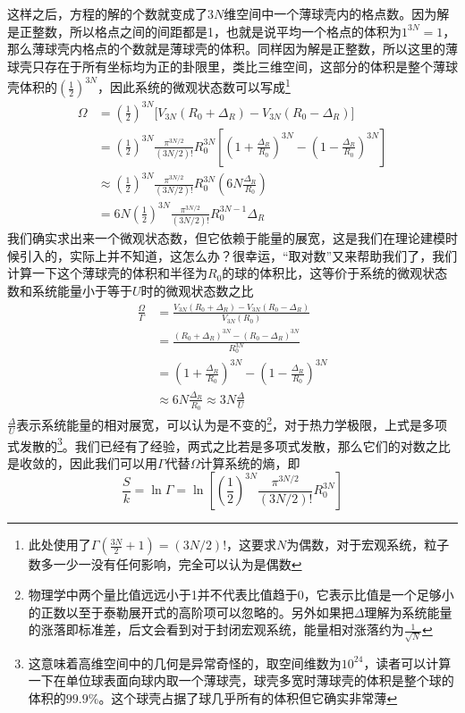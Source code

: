 \documentclass[../../main.tex]{subfiles}
\begin{document}
这样之后，方程的解的个数就变成了\(3N\)维空间中一个薄球壳内的格点数。因为解是正整数，所以格点之间的间距都是1，也就是说平均一个格点的体积为\(1^{3N}=1\)，那么薄球壳内格点的个数就是薄球壳的体积。同样因为解是正整数，所以这里的薄球壳只存在于所有坐标均为正的卦限里，类比三维空间，这部分的体积是整个薄球壳体积的\(\left(\frac{1}{2}\right)^{3N}\)，因此系统的微观状态数可以写成\footnote{此处使用了\(\Gamma(\frac{3N}{2}+1)=(3N/2)!\)，这要求\(N\)为偶数，对于宏观系统，粒子数多一少一没有任何影响，完全可以认为是偶数}
\begin{equation}
    \begin{split}
        \Omega&=\left(\frac{1}{2}\right)^{3N}\bigg[V_{3N}(R_0+\Delta_R)-V_{3N}(R_0-\Delta_R)\bigg] \\
        &=\left(\frac{1}{2}\right)^{3N}\frac{\pi^{3N/2}}{(3N/2)!}R_0^{3N}\left[\left(1+\frac{\Delta_R}{R_0}\right)^{3N}-\left(1-\frac{\Delta_R}{R_0}\right)^{3N}\right] \\
        &\approx \left(\frac{1}{2}\right)^{3N}\frac{\pi^{3N/2}}{(3N/2)!}R_0^{3N}\left(6N\frac{\Delta_R}{R_0}\right) \\
        &=6N\left(\frac{1}{2}\right)^{3N}\frac{\pi^{3N/2}}{(3N/2)!}R_0^{3N-1}\Delta_R
    \end{split}
\end{equation}
我们确实求出来一个微观状态数，但它依赖于能量的展宽，这是我们在理论建模时候引入的，实际上并不知道，这怎么办？很幸运，“取对数”又来帮助我们了，我们计算一下这个薄球壳的体积和半径为\(R_0\)的球的体积比，这等价于系统的微观状态数和系统能量小于等于\(U\)时的微观状态数之比
\begin{equation}
    \begin{split}
        \frac{\Omega}{\Gamma}&=\frac{V_{3N}(R_0+\Delta_R)-V_{3N}(R_0-\Delta_R)}{V_{3N}(R_0)} \\
        &=\frac{(R_0+\Delta_R)^{3N}-(R_0-\Delta_R)^{3N}}{R_0^{3N}} \\
        &=\left(1+\frac{\Delta_R}{R_0}\right)^{3N}-\left(1-\frac{\Delta_R}{R_0}\right)^{3N} \\
        &\approx 6N\frac{\Delta_R}{R_0} \approx 3N\frac{\Delta}{U}
    \end{split}
\end{equation}
\(\frac{\Delta}{U}\)表示系统能量的相对展宽，可以认为是不变的\footnote{物理学中两个量比值远远小于1并不代表比值趋于0，它表示比值是一个足够小的正数以至于泰勒展开式的高阶项可以忽略的。另外如果把\(\Delta\)理解为系统能量的涨落即标准差，后文会看到对于封闭宏观系统，能量相对涨落约为\(\frac{1}{\sqrt{N}}\)}，对于热力学极限，上式是多项式发散的\footnote{这意味着高维空间中的几何是异常奇怪的，取空间维数为\(10^{24}\)，读者可以计算一下在单位球表面向球内取一个薄球壳，球壳多宽时薄球壳的体积是整个球的体积的\(99.9\%\)。这个球壳占据了球几乎所有的体积但它确实非常薄}。我们已经有了经验，两式之比若是多项式发散，那么它们的对数之比是收敛的，因此我们可以用\(\Gamma\)代替\(\Omega\)计算系统的熵，即
\begin{equation*}
    \frac{S}{k}=\ln\Gamma=\ln\left[\left(\frac{1}{2}\right)^{3N}\frac{\pi^{3N/2}}{(3N/2)!}R_0^{3N}\right]
\end{equation*}
\end{document}
